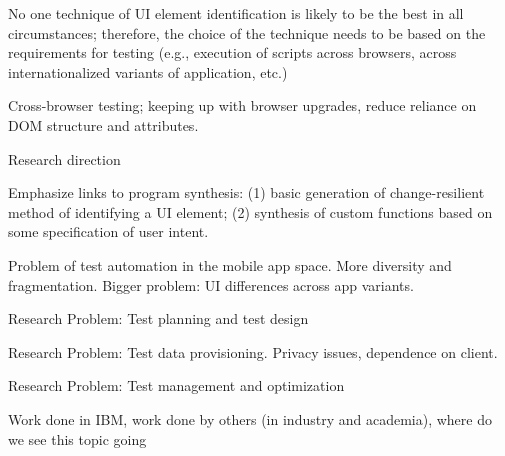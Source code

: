 No one technique of UI element identification is likely to be the best in all
circumstances; therefore, the choice of the technique needs to be based on the
requirements for testing (e.g., execution of scripts across browsers, across
internationalized variants of application, etc.)

Cross-browser testing; keeping up with browser upgrades, reduce reliance on
DOM structure and attributes.

Research direction

Emphasize links to program synthesis: (1) basic generation of change-resilient
method of identifying a UI element; (2) synthesis of custom functions based on
some specification of user intent.

Problem of test automation in the mobile app space. More diversity and
fragmentation. Bigger problem: UI differences across app variants.

Research Problem: Test planning and test design

Research Problem: Test data provisioning. Privacy issues, dependence on client.

Research Problem: Test management and optimization


Work done in IBM, work done by others (in industry and academia), where do we
see this topic going
